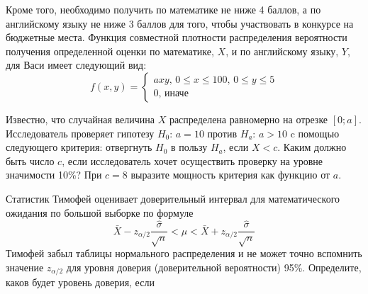 \documentclass[addpoints, answers]{exam} %
\begin{document}
\begin{questions}
Кроме того, необходимо получить по математике не
ниже 4 баллов, а по английскому языку не ниже 3 баллов для того, чтобы участвовать в
конкурсе на бюджетные места. Функция совместной плотности распределения
вероятности получения определенной оценки по математике, $X$, и по английскому языку, $Y$, для Васи имеет следующий вид:
\[
f(x,y)=
\begin{cases}
axy, \, 0\leq x\leq 100,\, 0\leq y\leq 5 \\
0,\, \text{иначе}
\end{cases}
\]


\question Известно, что случайная величина $X$ распределена равномерно на отрезке $[0; a]$.
Исследователь проверяет гипотезу $H_0$: $a=10$ против $H_a$: $a>10$ c помощью
следующего критерия: отвергнуть $H_0$ в пользу $H_a$, если $X<c$. Каким должно быть
число $c$, если исследователь хочет осуществить проверку на уровне значимости 10\%? При
$c=8$ выразите мощность критерия как функцию от $a$.

\question Статистик Тимофей оценивает доверительный интервал для математического ожидания по большой выборке по формуле
\[
\bar{X}-z_{\alpha/2}\frac{\hat{\sigma}}{\sqrt{n}} < \mu < \bar{X}+z_{\alpha/2}\frac{\hat{\sigma}}{\sqrt{n}}
\]
Тимофей забыл таблицы нормального распределения и не может точно вспомнить значение $z_{\alpha/2}$ для уровня
доверия (доверительной вероятности) 95\%. Определите, каков будет уровень доверия, если



\end{questions}
\end{document}
